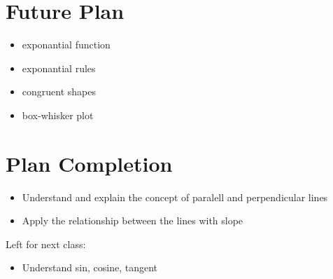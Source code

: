 \documentclass[12pt]{article}
\begin{document}
\section{Future Plan}
\begin{itemize}
    \item exponantial function
    \item exponantial rules
    \item congruent shapes
    \item box-whisker plot

\end{itemize}
\section{Plan Completion}
\begin{itemize}
    \item Understand and explain the concept of paralell and perpendicular lines
    \item Apply the relationship between the lines with slope
\end{itemize}
Left for next class: 
\begin{itemize}
    \item Understand sin, cosine, tangent
\end{itemize}
\end{document}
